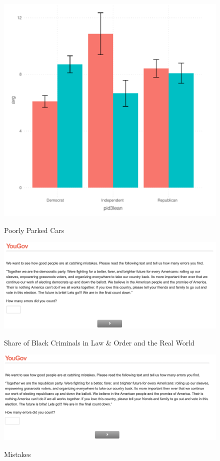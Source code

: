 \documentclass[12pt, letterpaper]{article}
\begin{document}
\begin{figure}[!htbp]
\centering
\caption{Poorly Parked Cars}
\includegraphics[scale=.6]{../figs/parking.pdf}
\label{fig:mistakes_rep}
\end{figure}


\clearpage



\begin{figure}[!htbp]
\centering
\caption{Share of Black Criminals in Law \& Order and the Real World}
\includegraphics[scale=.4]{../data/treats/Mistakes_Dem.png}
\label{fig:mistakes_dem}
\end{figure}

\begin{figure}[!htbp]
\centering
\caption{Mistakes}
\includegraphics[scale=.4]{../data/treats/Mistakes_Rep.png}
\label{fig:mistakes_rep}
\end{figure}
\end{document}
